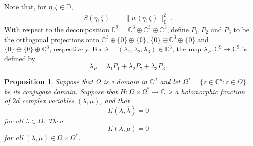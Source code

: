 \documentclass[11pt, reqno]{amsart}
\newtheorem{proposition}[theorem]{Proposition}
\newcommand\1{\boldsymbol {1}}
\newcommand{\D}{\mathbb{D}}
\newcommand\beq{\begin{equation}}
\newcommand\eeq{\end{equation}}
\numberwithin{equation}{section}
\begin{document}
Note that, for $\eta,\zeta \in\D$,
\begin{align*}
    S(\eta,\zeta) &= \|w(\eta,\zeta)\|_{\mathbb{C}^{3}}^{2}.
\end{align*}
With respect to the decomposition $\mathbb{C}^{9}=\mathbb{C}^{3}\oplus\mathbb{C}^{3}\oplus\mathbb{C}^{3}$, define $P_{1}, P_{2}$ and $P_{3}$ to be the orthogonal projections onto $\mathbb{C}^{3}\oplus\{0\}\oplus\{0\}$, $\{0\}\oplus\mathbb{C}^{3}\oplus\{0\}$ and $\{0\}\oplus\{0\}\oplus\mathbb{C}^{3}$, respectively. For $\lambda=(\lambda_{1},\lambda_{2},\lambda_{3})\in\mathbb{D}^{3}$, the map $\lambda_{P}:\mathbb{C}^{9}\rightarrow\mathbb{C}^{9}$ is defined by
\beq\label{lambdaP}
\lambda_{P} = \lambda_{1}P_{1}+\lambda_{2}P_{2}+\lambda_{3}P_{3}.
\eeq 

\begin{proposition}{}\label{polarizationtheorem}
Suppose that $\Omega$ is a domain in $\mathbb{C}^{d}$ and let $\Omega^{*}=\{z\in\mathbb{C}^{d} : \overline{z}\in\Omega\}$ be its conjugate domain. Suppose that $H:\Omega \times \Omega^{*}\rightarrow \mathbb{C}$ is a holomorphic function of $2d$ complex variables $(\lambda,\mu)$, and that 
$$H(\lambda,\overline{\lambda})=0$$
for all $\lambda\in\Omega$. Then
$$H(\lambda,\mu)=0$$
for all $(\lambda,\mu)\in\Omega\times\Omega^{*}$.
\end{proposition}
\end{document}
